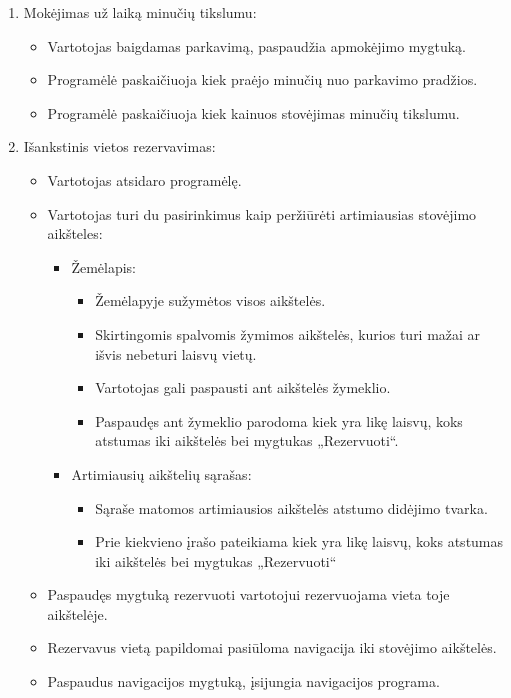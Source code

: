 \documentclass{VUMIFPSkursinis}
\begin{document}
\begin{enumerate}
\begin{itemize}
		\end{itemize}
	\item Mokėjimas už laiką minučių tikslumu:
		\begin{itemize}
			\item Vartotojas baigdamas parkavimą, paspaudžia apmokėjimo mygtuką.
			\item Programėlė paskaičiuoja kiek praėjo minučių nuo parkavimo pradžios.
			\item Programėlė paskaičiuoja kiek kainuos stovėjimas minučių tikslumu.
		\end{itemize}
	\item Išankstinis vietos rezervavimas:
		\begin{itemize}
			\item Vartotojas atsidaro programėlę.
			\item Vartotojas turi du pasirinkimus kaip peržiūrėti artimiausias stovėjimo aikšteles:
				\begin{itemize}
					\item Žemėlapis:
						\begin{itemize}
							\item Žemėlapyje sužymėtos visos aikštelės.
							\item Skirtingomis spalvomis žymimos aikštelės, kurios turi mažai ar išvis nebeturi laisvų vietų.
							\item Vartotojas gali paspausti ant aikštelės žymeklio.
							\item Paspaudęs ant žymeklio parodoma kiek yra likę laisvų, koks atstumas iki aikštelės bei mygtukas „Rezervuoti“.
						\end{itemize}
					\item Artimiausių aikštelių sąrašas:
						\begin{itemize}
							\item Sąraše matomos artimiausios aikštelės atstumo didėjimo tvarka.
							\item Prie kiekvieno įrašo pateikiama kiek yra likę laisvų, koks atstumas iki aikštelės bei mygtukas „Rezervuoti“
						\end{itemize}
				\end{itemize}
			\item Paspaudęs mygtuką rezervuoti vartotojui rezervuojama vieta toje aikštelėje.
			\item Rezervavus vietą papildomai pasiūloma navigacija iki stovėjimo aikštelės.
			\item Paspaudus navigacijos mygtuką, įsijungia navigacijos programa.
		\end{itemize}

\end{enumerate}
\end{document}
